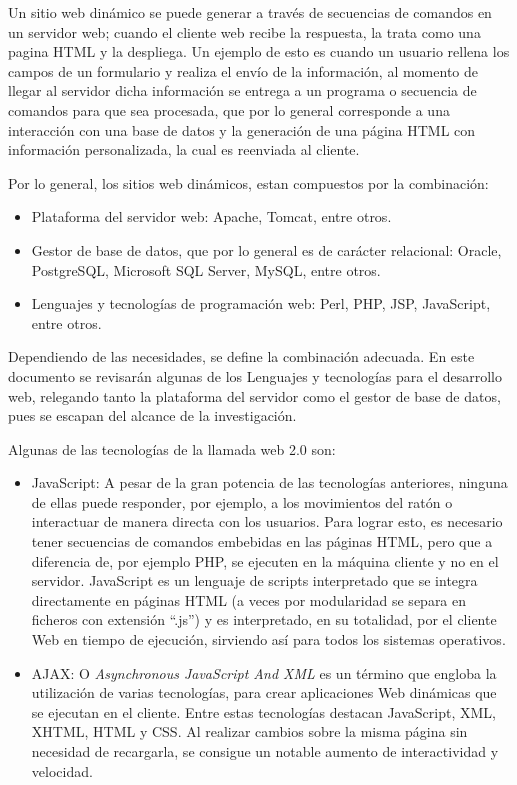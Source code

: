 Un sitio web dinámico se puede generar a través de secuencias de comandos en un servidor web; cuando el cliente web recibe la 
respuesta, la trata como una pagina HTML y la despliega. Un ejemplo de esto es cuando un usuario rellena los campos de un formulario y
realiza el envío de la información, al momento de llegar al servidor dicha información se entrega a un programa o secuencia de comandos
para que sea procesada, que por lo general corresponde a una interacción con una base de datos y la generación de una página HTML
con información personalizada, la cual es reenviada al cliente.

Por lo general, los sitios web dinámicos, estan compuestos por la combinación:
\begin{itemize}
 \item Plataforma del servidor web: Apache, Tomcat, entre otros.
 \item Gestor de base de datos, que por lo general es de carácter relacional: Oracle, PostgreSQL, Microsoft SQL Server, MySQL, entre otros.
 \item Lenguajes y tecnologías de programación web: Perl, PHP, JSP, JavaScript, entre otros.
\end{itemize}

Dependiendo de las necesidades, se define la combinación adecuada. En este documento se revisarán algunas de los Lenguajes y
tecnologías para el desarrollo web, relegando tanto la plataforma del servidor como el gestor de base de datos, pues se escapan 
del alcance de la investigación.

Algunas de las tecnologías de la llamada web 2.0 son:

\begin{itemize}

 \item JavaScript: A pesar de la gran potencia de las tecnologías anteriores, ninguna de ellas puede responder, por ejemplo,
		   a los movimientos del ratón o interactuar de manera directa con los usuarios.
		   Para lograr esto, es necesario tener secuencias de comandos embebidas en las páginas HTML, pero que a diferencia
		   de, por ejemplo PHP,  se ejecuten en la máquina cliente y no en el servidor.
		   JavaScript es un lenguaje de scripts interpretado que se integra directamente en páginas HTML (a veces por 
		   modularidad se separa en ficheros con extensión “.js”) y es interpretado, en su totalidad, por el cliente Web 
		   en tiempo de ejecución, sirviendo así para todos los sistemas operativos.
		   
 \item AJAX: O \textit{Asynchronous JavaScript And XML} es un término que engloba la utilización de varias tecnologías, para crear 
	      aplicaciones Web dinámicas que se ejecutan en el cliente. Entre estas tecnologías destacan JavaScript, XML, XHTML, HTML 
	      y CSS. Al realizar cambios sobre la misma página sin necesidad de recargarla, se consigue un notable aumento de 
	      interactividad y velocidad.
 \end{itemize}

